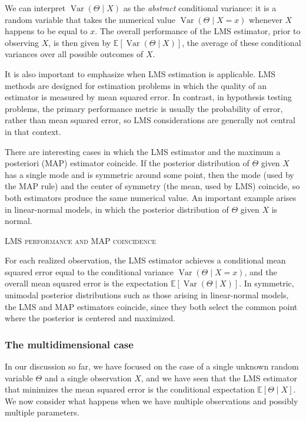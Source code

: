 We can interpret \(\operatorname{Var}(\Theta \mid X)\) as the \textit{abstract} conditional variance: it is a random variable that takes the numerical value \(\operatorname{Var}(\Theta \mid X = x)\) whenever \(X\) happens to be equal to \(x\).  
The overall performance of the LMS estimator, prior to observing \(X\), is then given by \(\mathbb{E}[\operatorname{Var}(\Theta \mid X)]\), the average of these conditional variances over all possible outcomes of \(X\).

It is also important to emphasize when LMS estimation is applicable.  
LMS methods are designed for estimation problems in which the quality of an estimator is measured by mean squared error.  
In contrast, in hypothesis testing problems, the primary performance metric is usually the probability of error, rather than mean squared error, so LMS considerations are generally not central in that context.

There are interesting cases in which the LMS estimator and the maximum a posteriori (MAP) estimator coincide.  
If the posterior distribution of \(\Theta\) given \(X\) has a single mode and is symmetric around some point, then the mode (used by the MAP rule) and the center of symmetry (the mean, used by LMS) coincide, so both estimators produce the same numerical value.  
An important example arises in linear-normal models, in which the posterior distribution of \(\Theta\) given \(X\) is normal.

\bigskip
\textsc{LMS performance and MAP coincidence}

For each realized observation, the LMS estimator achieves a conditional mean squared error equal to the conditional variance \(\operatorname{Var}(\Theta \mid X = x)\), and the overall mean squared error is the expectation \(\mathbb{E}[\operatorname{Var}(\Theta \mid X)]\).  
In symmetric, unimodal posterior distributions such as those arising in linear-normal models, the LMS and MAP estimators coincide, since they both select the common point where the posterior is centered and maximized.


\subsubsection{The multidimensional case}

In our discussion so far, we have focused on the case of a single unknown random variable \(\Theta\) and a single observation \(X\), and we have seen that the LMS estimator that minimizes the mean squared error is the conditional expectation \(\mathbb{E}[\Theta \mid X]\).  
We now consider what happens when we have multiple observations and possibly multiple parameters.

